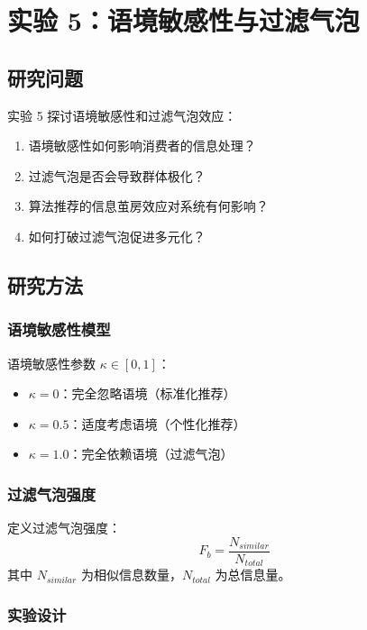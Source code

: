\documentclass[a4paper,12pt]{article}
\begin{document}
\section{实验 5：语境敏感性与过滤气泡}

\subsection{研究问题}

实验 5 探讨语境敏感性和过滤气泡效应：
\begin{enumerate}
    \item 语境敏感性如何影响消费者的信息处理？
    \item 过滤气泡是否会导致群体极化？
    \item 算法推荐的信息茧房效应对系统有何影响？
    \item 如何打破过滤气泡促进多元化？
\end{enumerate}

\subsection{研究方法}

\subsubsection{语境敏感性模型}

语境敏感性参数 $\kappa \in [0,1]$：
\begin{itemize}
    \item $\kappa = 0$：完全忽略语境（标准化推荐）
    \item $\kappa = 0.5$：适度考虑语境（个性化推荐）
    \item $\kappa = 1.0$：完全依赖语境（过滤气泡）
\end{itemize}

\subsubsection{过滤气泡强度}

定义过滤气泡强度：
\begin{equation}
    F_b = \frac{N_{similar}}{N_{total}}
\end{equation}
其中 $N_{similar}$ 为相似信息数量，$N_{total}$ 为总信息量。

\subsubsection{实验设计}
\end{document}
